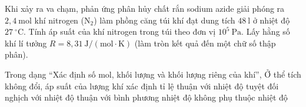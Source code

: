 \begin{ex}
	Khi xảy ra va chạm, phản ứng phân hủy chất rắn sodium azide giải phóng ra $2,4\ \mathrm{mol}$ khí nitrogen ($\mathrm{N_2}$) làm phồng căng túi khí đạt dung tích $48\ \mathrm{l}$ ở nhiệt độ $27\ ^\circ\mathrm{C}$. Tính áp suất của khí nitrogen trong túi theo đơn vị $10^5\ \mathrm{Pa}$. Lấy hằng số khí lí tưởng $R = 8,31\ \mathrm{J/(mol\cdot K)}$ (làm tròn kết quả đến một chữ số thập phân).
\end{ex}

\begin{ex}
Trong dạng “Xác định số mol, khối lượng và khối lượng riêng của khí”, Ở thể tích không đổi, áp suất của lượng khí xác định tỉ lệ
\choice
{\True thuận với nhiệt độ tuyệt đối}
{nghịch với nhiệt độ}
{thuận với bình phương nhiệt độ}
{không phụ thuộc nhiệt độ}
\end{ex}

